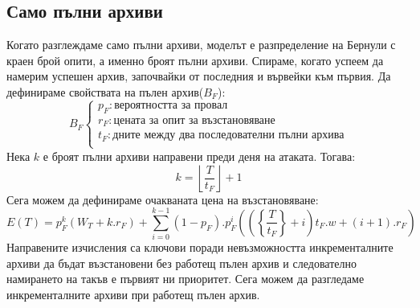 \documentclass[11pt, a4paper]{article}
\theoremstyle{definition}
\begin{document}
		\subsection{Само пълни архиви}
			Когато разглеждаме само пълни архиви, моделът е разпределение на Бернули с краен брой опити, а именно броят пълни архиви. Спираме, когато успеем да намерим успешен архив, започвайки от последния и вървейки към първия. Да дефинираме свойствата на пълен архив($B_F$):
			$$
			B_F
			\begin{cases}
			p_F: \text{вероятността за провал}\\
			r_F: \text{цената за опит за възстановяване}\\
			t_F: \text{дните между два последователни пълни архива}\\
			\end{cases}
			$$
			Нека $k$ е броят пълни архиви направени преди деня на атаката. Тогава:
			$$
			k = \left \lfloor{\frac{T}{t_F}}\right \rfloor + 1
			$$
			Сега можем да дефинираме очакваната цена на възстановяване:
			\begin{equation}
			\label{eq:1}
			E(T) = p_F^{k}\left(W_T + k.r_F\right) + \displaystyle \sum_{i=0}^{k-1} (1-p_F).p_F^{i}\left( \left (\left\{ \frac{T}{t_F}\right \} + i\right)t_F.w + (i+1).r_F \right )
			\end{equation}
			Направените изчисления са ключови поради невъзможността инкременталните архиви да бъдат възстановени без работещ пълен архив и следователно намирането на такъв е първият ни приоритет. Сега можем да разгледаме инкременталните архиви при работещ пълен архив.
\end{document}
